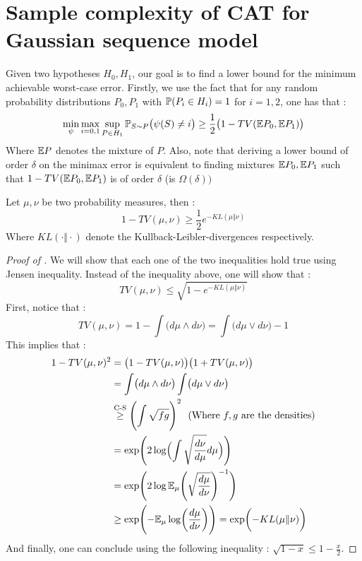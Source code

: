 \section{Sample complexity of CAT for Gaussian sequence model}
Given two hypotheses $H_0,H_1$, our goal is to find a lower bound for the minimum achievable worst-case error. 
Firstly, we use the fact that for any random probability distributions $P_0,P_1$ with $\P(P_i\in H_i)=1$ for $i=1,2$, one has that : 
\begin{equation}\label{lowerbounderror}
    \min_{\psi}\max_{i=0,1}\sup_{P\in H_1} \P_{S\sim P} \big(\psi(S) \neq i \big) \geq \frac{1}{2}\big(1-TV(\E P_0,\E P_1)\big)
\end{equation}
Where $\E P$ denotes the mixture of $P$. Also, note that deriving a lower bound of order $\delta$ on the minimax error is equivalent to finding mixtures $\E P_0,\E P_1$ such that $1-TV(\E P_0,\E P_1)$ is of order $\delta$ (is $\Omega(\delta))$

\begin{lemma}\label{rubignolle}\cite{tsybakov}
    Let $\mu,\nu$ be two probability measures, then : 
    \begin{equation*}
        1-TV(\mu,\nu) \geq \frac{1}{2} e^{-KL(\mu \Vert \nu)} 
    \end{equation*}
    Where $KL(\cdot \Vert \cdot)$ denote the Kullback-Leibler-divergences respectively. 
\end{lemma}
\begin{proof} [Proof of ] We will show that each one of the two inequalities hold true using Jensen inequality. 
    Instead of the inequality above, one will show that : \begin{equation*}
        TV(\mu,\nu) \leq \sqrt{1-e^{-KL(\mu\Vert\nu)}} 
    \end{equation*}
    First, notice that : \begin{equation*}
        TV(\mu, \nu) = 1- \int \bigl(d\mu \land d\nu\bigr) = \int \bigl(d\mu \lor d\nu\bigr) -1 
    \end{equation*}
    This implies that : \begin{align*}
        1 - TV(\mu,\nu)^2 &= \bigl(1 - TV(\mu,\nu)\bigr)\bigl(1+TV(\mu,\nu)\bigr) \\
        &= \int \bigl(d\mu \land d\nu\bigr)\int \bigl(d\mu \lor d\nu\bigr) \\
        &\stackrel{\text{C-S}}{\geq} \Biggl(\int \sqrt{fg}\Biggr)^2 \  \text{ (Where $f,g$ are the densities)}\\ 
        &= \exp\Biggl(2\log\Bigl(\int \sqrt{\frac{d\nu}{d\mu}} d\mu\Bigr)\Biggr) \\ 
        &= \exp\Biggl(2\log\E_\mu \Biggl(\sqrt{\frac{d\mu}{d\nu}}\Biggr)^{-1} \Biggr) \\
        &\geq \exp \Biggl(-\E_\mu \log\biggl(\frac{d\mu}{d\nu}\biggr)\Biggr) = \exp\biggl(-KL(\mu\Vert\nu)\biggr)
    \end{align*}
    And finally, one can conclude using the following inequality : $\sqrt{1-x} \leq 1-\frac{x}{2}$.
\end{proof}

